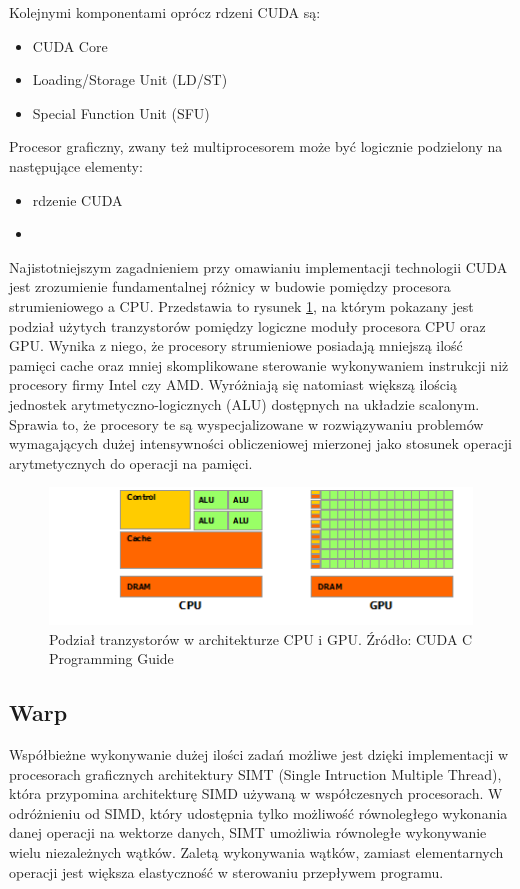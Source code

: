 Kolejnymi komponentami oprócz rdzeni CUDA są:
\begin{itemize}
\item CUDA Core
\item Loading/Storage Unit (LD/ST)
\item Special Function Unit (SFU)
\end{itemize}

Procesor graficzny, zwany też multiprocesorem może być logicznie
podzielony na następujące elementy:
\begin{itemize}
\item rdzenie CUDA
\item 
\end{itemize}

Najistotniejszym zagadnieniem przy omawianiu implementacji technologii CUDA jest
zrozumienie fundamentalnej różnicy w budowie pomiędzy procesora strumieniowego a CPU.
Przedstawia to rysunek \ref{cpugpu}, na którym pokazany jest podział użytych
tranzystorów pomiędzy logiczne moduły procesora CPU oraz GPU.  Wynika z
niego, że procesory strumieniowe posiadają mniejszą ilość pamięci cache oraz mniej
skomplikowane sterowanie wykonywaniem instrukcji niż procesory firmy Intel czy
AMD. Wyróżniają się natomiast większą ilością jednostek arytmetyczno-logicznych
(ALU) dostępnych na układzie scalonym. Sprawia to, że procesory te są
wyspecjalizowane w rozwiązywaniu problemów wymagających dużej intensywności
obliczeniowej mierzonej jako stosunek operacji arytmetycznych do operacji na
pamięci.

\begin{figure}[H]
\centering
\includegraphics{images/gpu-devotes-more-transistors-to-data-processing.png}
\caption{Podział tranzystorów w architekturze CPU i GPU. Źródło: CUDA C Programming Guide}
\label{cpugpu}
\end{figure}

\subsection{Warp}

Współbieżne wykonywanie dużej ilości zadań możliwe jest dzięki implementacji
w procesorach graficznych architektury SIMT (Single Intruction Multiple Thread), która
przypomina architekturę SIMD używaną w współczesnych procesorach. W
odróżnieniu od SIMD, który udostępnia tylko możliwość równoległego wykonania danej
operacji na wektorze danych, SIMT umożliwia równoległe wykonywanie wielu
niezależnych wątków. Zaletą wykonywania wątków, zamiast elementarnych operacji jest większa
elastyczność w sterowaniu przepływem programu.

